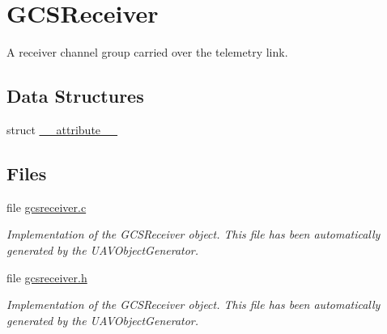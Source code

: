 \hypertarget{group___g_c_s_receiver}{\section{\-G\-C\-S\-Receiver}
\label{group___g_c_s_receiver}
}


\-A receiver channel group carried over the telemetry link.  


\subsection*{\-Data \-Structures}
\begin{DoxyCompactItemize}
\item 
struct \hyperlink{struct____attribute____}{\-\_\-\-\_\-attribute\-\_\-\-\_\-}
\end{DoxyCompactItemize}
\subsection*{\-Files}
\begin{DoxyCompactItemize}
\item 
file \hyperlink{gcsreceiver_8c}{gcsreceiver.\-c}
\begin{DoxyCompactList}\small\item\em \-Implementation of the \-G\-C\-S\-Receiver object. \-This file has been automatically generated by the \-U\-A\-V\-Object\-Generator. \end{DoxyCompactList}\item 
file \hyperlink{gcsreceiver_8h}{gcsreceiver.\-h}
\begin{DoxyCompactList}\small\item\em \-Implementation of the \-G\-C\-S\-Receiver object. \-This file has been automatically generated by the \-U\-A\-V\-Object\-Generator. \end{DoxyCompactList}\end{DoxyCompactItemize}
